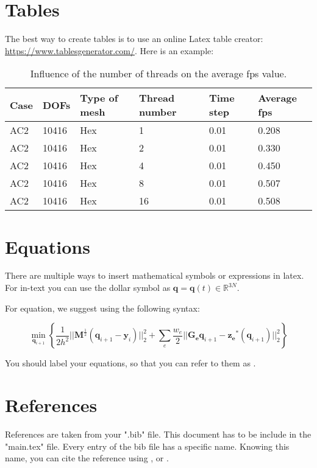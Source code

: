 \section{Tables}\label{tables}

The best way to create tables is to use an online Latex table creator: \url{https://www.tablesgenerator.com/}. Here is an example:

\begin{table}[htp]
    \centering
    \begin{tabular}{@{}llllll@{}}
    \toprule
    Case & DOFs  & Type of mesh & Thread number & Time step & Average fps  \\ \midrule
    AC2  & 10416 & Hex          & 1             & 0.01      & 0.208 \\
    AC2  & 10416 & Hex          & 2             & 0.01      & 0.330 \\
    AC2  & 10416 & Hex          & 4             & 0.01      & 0.450 \\
    AC2  & 10416 & Hex          & 8             & 0.01      & 0.507 \\
    AC2  & 10416 & Hex          & 16            & 0.01      & 0.508 \\ \bottomrule
    \end{tabular}
    \caption{Influence of the number of threads on the average fps value.}
    \label{tab:thread_number}
\end{table}


\section{Equations}\label{equations}

There are multiple ways to insert mathematical symbols or expressions in latex. For in-text you can use the dollar symbol as $\bm{q}=\bm{q}(t)\in \mathbb{R}^{3N}$. 

For equation, we suggest using the following syntax:

    \begin{equation}\label{optimization_problem}
        \min_{\bm{q}_{i+1}}\left\{ \frac{1}{2h^2}||\bm{M}^{\frac{1}{2}}(\bm{q}_{i+1}-\bm{y}_i)||_2^2 + \sum_e \frac{w_e}{2}||\bm{G_e}\bm{q}_{i+1}-\bm{z_e}^\ast (\bm{q}_{i+1})||_2^2 \right\}
    \end{equation}
    
You should label your equations, so that you can refer to them as .


\section{References}\label{references}

References are taken from your ".bib" file. This document has to be include in the "main.tex" file. Every entry of the bib file has a specific name. Knowing this name, you can cite the reference using \citep{Bouaziz2014}, \citet{Bouaziz2014} or \cite{Bouaziz2014}. 

